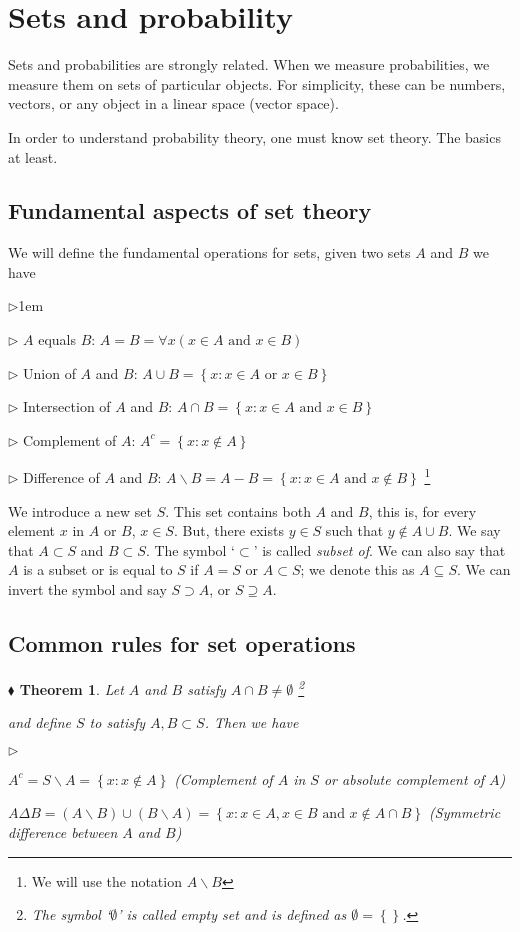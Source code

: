 \documentclass{report}
\newcommand*{\daggerfootnote}[1]{%
  \begingroup
  \renewcommand*{\thefootnote}{\fnsymbol{footnote}}%
  \footnote{#1}%
  \endgroup
}
\newtheorem{theorem}{$\blacklozenge$ Theorem}[chapter]
\begin{document}
\section{Sets and probability}
Sets and probabilities are strongly related. When we measure probabilities, we measure them on sets of particular 
objects. For simplicity, these can be numbers, vectors, or any object in a linear space (vector space).

In order to understand probability theory, one must know set theory. The basics at least.
\subsection{Fundamental aspects of set theory}
We will define the fundamental operations for sets, given two sets $A$ and $B$ we have 
\begin{list}{$\triangleright$}{1em}
    \item[$\triangleright$] $A$ equals $B$: $A = B = \forall x (x\in A \text{ and } x\in B)$
    \item[$\triangleright$] Union of $A$ and $B$: $A\cup B = \left\{x: x\in A \text{ or } x \in B\right\}$
    \item[$\triangleright$] Intersection of $A$ and $B$: $A\cap B = \left\{x: x\in A \text{ and } x \in B\right\}$
    \item[$\triangleright$] Complement of $A$: $A^{c} = \left\{x: x\notin A\right\}$
    \item[$\triangleright$] Difference of $A$ and $B$: $A\backslash B = A - B= \left\{x: x\in A \text{ and } x\notin B\right\}$\daggerfootnote{We will use the notation $A\backslash B$}
\end{list}

We introduce a new set $S$. This set contains both $A$ and $B$, this is, for every element $x$ in $A$ or $B$, 
$x\in S$. But, there exists $y\in S$ such that $y\notin A\cup B$. We say that $A\subset S$ and $B\subset S$. The 
symbol `$\subset$' is called \textit{subset of}. We can also say that $A$ is a subset or is equal to $S$ if $A=S$
or $A \subset S$; we denote this as $A\subseteq S$. We can invert the symbol and say $S\supset A$, or $S \supseteq A$.

\subsection{Common rules for set operations}

\begin{theorem}
    Let $A$ and $B$ satisfy $A\cap B \neq \emptyset$\daggerfootnote{The symbol `$\emptyset$' is called \textit{empty set} and is defined as $\emptyset = \left\{\right\}$. }
    and define $S$ to satisfy $A,B\subset S$. Then we have 
    \begin{list}{$\triangleright$}{}
        \item $A^{c} = S\backslash A = \left\{x: x\notin A\right\}$ (Complement of $A$ in $S$ or absolute complement of $A$)
        \item $A\Delta B = (A\backslash B) \cup (B \backslash A) = \left\{x: x\in A, x\in B \text{ and } x \notin A\cap B\right\}$ (Symmetric difference between $A$ and $B$)
    \end{list}
\end{theorem}
\end{document}
